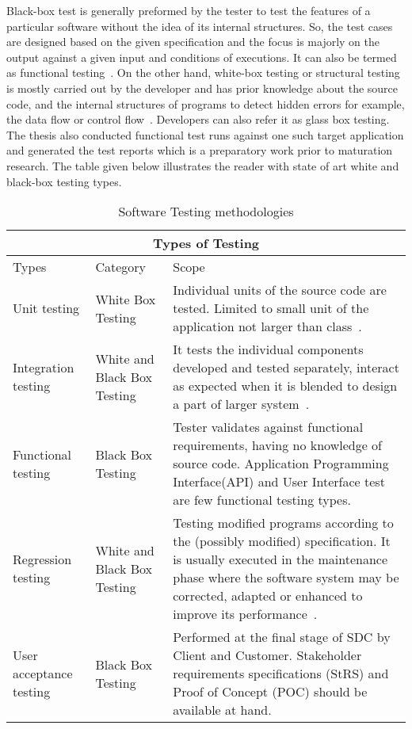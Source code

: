 Black-box test is generally preformed by the tester to test the features of a particular software without the idea of its internal structures. So, the test cases are designed based on the given specification and the focus is majorly on the output against a given input and conditions of executions. It can also be termed as functional testing~\parencite{nidhra2012black}. On the other hand, white-box testing or structural testing is mostly carried out by the developer and has prior knowledge about the source code, and the internal structures of programs to detect hidden errors for example, the data flow or control flow~\parencite{shao2007case}. Developers can also refer it as glass box testing. The thesis also conducted functional test runs against one such target application and generated the test reports which is a preparatory work prior to maturation research. The table given below illustrates the reader with state of art white and black-box testing types.
\begin{table}[ht!]
\caption{Software Testing methodologies}
\label{tab:testing types}
\centering
\begin{tabular}{ |p{3cm}|p{3cm}|p{7cm}|  }
 \hline
 \multicolumn{3}{|c|}{Types of Testing} \\
\toprule
Types & Category & Scope \\
\midrule    
Unit testing&   White Box Testing& Individual units of the source code are tested. Limited to small unit of the application not larger than class~\parencite{nidhra2012black}.\\
\midrule 
Integration testing&   White and Black Box Testing  & It tests the individual components developed and tested separately, interact as expected when it is blended to design a part of larger system~\parencite{7100358}. \\
\midrule 
Functional testing & Black Box Testing & Tester validates against functional requirements, having no knowledge of source code. Application Programming Interface(API) and User Interface test are few functional testing types.  \\
\midrule 
Regression testing &White  and  Black Box Testing & Testing modified programs according to the (possibly modified) specification. It is usually executed in the maintenance phase where the software system may be corrected, adapted or enhanced to improve its performance~\parencite{65194}.\\
\midrule 
User acceptance testing& Black Box Testing & Performed at the final stage of SDC by Client and Customer. Stakeholder requirements specifications (StRS) and Proof of Concept (POC) should be available at hand.\\
\hline
\end{tabular}
\end{table}



